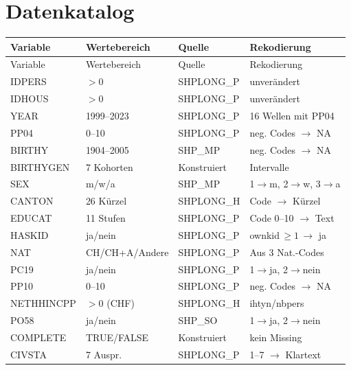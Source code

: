 

\chapter{Datenkatalog}
\label{AppendixA}

\begin{longtable}{llll}
\toprule
Variable & Wertebereich & Quelle & Rekodierung \\
\midrule
\endfirsthead
\toprule
Variable & Wertebereich & Quelle & Rekodierung \\
\midrule
\endhead
\bottomrule
\endfoot
IDPERS      & $> 0$           & SHPLONG\_P  & unverändert \\
IDHOUS      & $> 0$           & SHPLONG\_P  & unverändert \\
YEAR        & 1999--2023      & SHPLONG\_P  & 16 Wellen mit PP04 \\
PP04        & 0--10           & SHPLONG\_P  & neg. Codes $\rightarrow$ NA \\
BIRTHY      & 1904--2005      & SHP\_MP     & neg. Codes $\rightarrow$ NA \\
BIRTHYGEN   & 7 Kohorten      & Konstruiert & Intervalle \\
SEX         & m/w/a           & SHP\_MP     & 1$\rightarrow$m, 2$\rightarrow$w, 3$\rightarrow$a \\
CANTON      & 26 Kürzel       & SHPLONG\_H  & Code $\rightarrow$ Kürzel \\
EDUCAT      & 11 Stufen       & SHPLONG\_P  & Code 0--10 $\rightarrow$ Text \\
HASKID      & ja/nein         & SHPLONG\_P  & ownkid$\,\geq 1\,\rightarrow$ ja \\
NAT         & CH/CH+A/Andere  & SHPLONG\_P  & Aus 3 Nat.-Codes \\
PC19        & ja/nein         & SHPLONG\_P  & 1$\rightarrow$ja, 2$\rightarrow$nein \\
PP10        & 0--10           & SHPLONG\_P  & neg. Codes $\rightarrow$ NA \\
NETHHINCPP  & $> 0$ (CHF)     & SHPLONG\_H  & ihtyn/nbpers \\
PO58        & ja/nein         & SHP\_SO     & 1$\rightarrow$ja, 2$\rightarrow$nein \\
COMPLETE    & TRUE/FALSE      & Konstruiert & kein Missing \\
CIVSTA      & 7 Auspr.        & SHPLONG\_P  & 1--7 $\rightarrow$ Klartext \\
\end{longtable}

